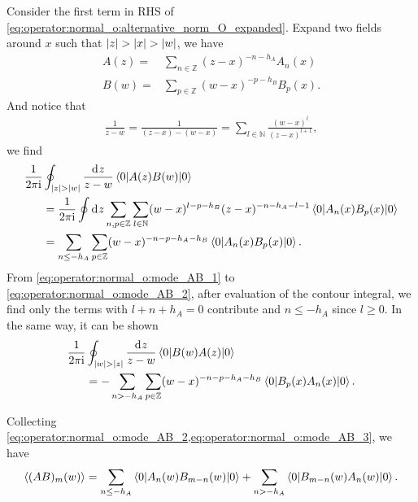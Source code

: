 \documentclass[10pt]{article}
\newcommand{\ii}{\mathrm{i}}
\begin{document}
Consider the first term in RHS of \cref{eq:operator:normal_o:alternative_norm_O_expanded}.
Expand two fields around $x$ such that $\abs{z}>\abs{x}>\abs{w}$, we have
\begin{subequations}
    \begin{align}
        A(z)= & \sum_{n\in\mathbb{Z}}(z-x)^{-n-h_A}A_n(x)   \\
        B(w)= & \sum_{p\in\mathbb{Z}} (w-x)^{-p-h_B}B_p(x).
    \end{align}
\end{subequations}
And notice that
\begin{align}
    \frac{1}{z-w}=\frac{1}{(z-x)-(w-x)}=\sum_{l\in\mathbb{N}}\frac{(w-x)^l}{(z-x)^{l+1}},
\end{align}
we find
\begin{subequations}
    \begin{align}
        \frac{1}{2\pi\ii} & \oint_{\abs{z}>\abs{w}}\frac{\dd[]{z}}{z-w}\ev**{A(z)B(w)}{0}\notag                                                                                                      \\
                          & =\frac{1}{2\pi\ii}\oint\dd[]{z}\sum_{n,p\in\mathbb{Z}}\sum_{l\in\mathbb{N}}(w-x)^{l-p-h_B}(z-x)^{-n-h_A-l-1}\ev**{A_n(x)B_p(x)}{0}\label{eq:operator:normal_o:mode_AB_1} \\
                          & =\sum_{n\leq-h_A}\sum_{p\in\mathbb{Z}}(w-x)^{-n-p-h_A-h_B}\ev**{A_n(x)B_p(x)}{0}.\label{eq:operator:normal_o:mode_AB_2}
    \end{align}
\end{subequations}
From \cref{eq:operator:normal_o:mode_AB_1} to \cref{eq:operator:normal_o:mode_AB_2}, after evaluation of the contour integral, we find only the terms with $l+n+h_A=0$ contribute and $n\leq-h_A$ since $l\geq0$.
In the same way, it can be shown
\begin{align}
    \frac{1}{2\pi\ii} & \oint_{\abs{w}>\abs{z}}\frac{\dd[]{z}}{z-w}\ev**{B(w)A(z)}{0}\notag                                                   \\
                      & =-\sum_{n>-h_A}\sum_{p\in\mathbb{Z}}(w-x)^{-n-p-h_A-h_B}\ev**{B_p(x)A_n(x)}{0}.\label{eq:operator:normal_o:mode_AB_3}
\end{align}

Collecting \cref{eq:operator:normal_o:mode_AB_2,eq:operator:normal_o:mode_AB_3}, we have
\begin{align}
    \expval{(AB)_m(w)}=\sum_{n\leq-h_A}\ev**{A_n(w) B_{m-n}(w)}{0}+\sum_{n>-h_A}\ev**{B_{m-n}(w)A_n(w)}{0}.
\end{align}
\end{document}

